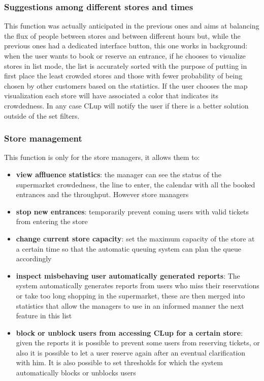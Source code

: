 \subsubsection{Suggestions among different stores and times}
This function was actually anticipated in the previous ones and aims at balancing the flux of people between stores and between different hours but, while the previous ones had a dedicated interface button, this one works in background: when the user wants to book or reserve an entrance, if he chooses to visualize stores in list mode, the list is accurately sorted with the purpose of putting in first place the least crowded stores and those with fewer probability of being chosen by other customers based on the statistics. If the user chooses the map visualization each store will have associated a color that indicates its crowdedness. In any case CLup will notify the user if there is a better solution outside of the set filters. 

\subsubsection{Store management} 
This function is only for the store managers, it allows them to:
\begin{itemize}
	\item
	\textbf{view affluence statistics}: the manager can see the status of the supermarket crowdedness, the line to enter, the calendar with all the booked entrances and the throughput. However store managers
	\item
	\textbf{stop new entrances}: temporarily prevent coming users with valid tickets from entering the store
	\item
	\textbf{change current store capacity}: set the maximum capacity of the store at a certain time so that the automatic queuing system can plan the queue accordingly
	\item
	\textbf{inspect misbehaving user automatically generated reports}: The system automatically generates reports from users who miss their reservations or take too long shopping in the supermarket, these are then merged into statistics that allow the managers to use in an informed manner the next feature in this list
	\item 
	\textbf{block or unblock users from accessing CLup for a certain store}: given the reports it is possible to prevent some users from reserving tickets, or also it is possible to let a user reserve again after an eventual clarification with him. It is also possible to set thresholds for which the system automatically blocks or unblocks users
\end{itemize}


